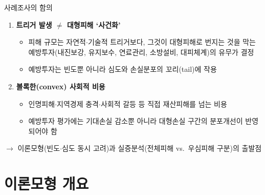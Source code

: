 \documentclass[aspectratio=169,10pt]{beamer}
\begin{document}
\begin{frame}{사례조사의 함의}
  \begin{enumerate}
    \item \textbf{트리거 발생 $\neq$ 대형피해 `사건화'}
    \begin{itemize}\small
      \item 피해 규모는 자연적$\cdot$기술적 트리거보다, 그것이 대형피해로 번지는 것을 막는\\
            예방투자(내진보강, 유지보수, 연료관리, 소방설비, 대피체계)의 유무가 결정
      \item[$\Rightarrow$] 예방투자는 빈도뿐 아니라 \alert{심도와 손실분포의 꼬리(tail)}에 작용
    \end{itemize}
    \vspace{6pt}
    \item \textbf{볼록한(convex) 사회적 비용}
    \begin{itemize}\small
      \item 인명피해$\cdot$지역경제 충격$\cdot$사회적 갈등 등 직접 재산피해를 넘는 비용
      \item[$\Rightarrow$] 예방투자 평가에는 기대손실 감소뿐 아니라 \alert{대형손실 구간의 분포개선}이 반영되어야 함
    \end{itemize}
  \end{enumerate}
  \vspace{6pt}
  \begin{center}
    \small $\rightarrow$ 이론모형(빈도$\cdot$심도 동시 고려)과 실증분석(전체피해 vs.\ 우심피해 구분)의 출발점
  \end{center}
\end{frame}

\section{이론모형 개요}
\end{document}
